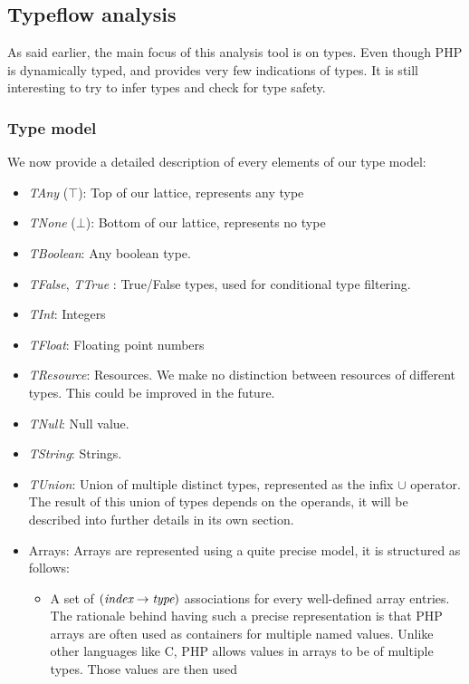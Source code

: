 \documentclass[a4paper]{article}
\begin{document}
\subsection{Typeflow analysis}
As said earlier, the main focus of this analysis tool is on types. Even though
PHP is dynamically typed, and provides very few indications of types. It is
still interesting to try to infer types and check for type safety.

\subsubsection{Type model}
We now provide a detailed description of every elements of our type model:
\begin{itemize}
  \item \emph{TAny} ($\top$): Top of our lattice, represents any type
  \item \emph{TNone} ($\bot$): Bottom of our lattice, represents no type
  \item \emph{TBoolean}: Any boolean type.
  \item \emph{TFalse}, \emph{TTrue} : True/False types, used for conditional
    type filtering.
  \item \emph{TInt}: Integers
  \item \emph{TFloat}: Floating point numbers
  \item \emph{TResource}: Resources. We make no distinction between resources
    of different types. This could be improved in the future.
  \item \emph{TNull}: Null value.
  \item \emph{TString}: Strings.
  \item \emph{TUnion}: Union of multiple distinct types, represented as the
    infix $\cup$ operator. The result of this union of types depends on the operands,
    it will be described into further details in its own section.
  \item Arrays: Arrays are represented using a quite precise model, it is
    structured as follows:
    \begin{itemize}
      \item A set of $(\emph{index} \rightarrow \emph{type})$ associations for
          every well-defined array entries. The rationale behind having such a precise
          representation is that PHP arrays are often used as containers for
          multiple named values. Unlike other languages like C, PHP allows values
          in arrays to be of multiple types. Those values are then used

\end{itemize}
\end{itemize}
\end{document}
